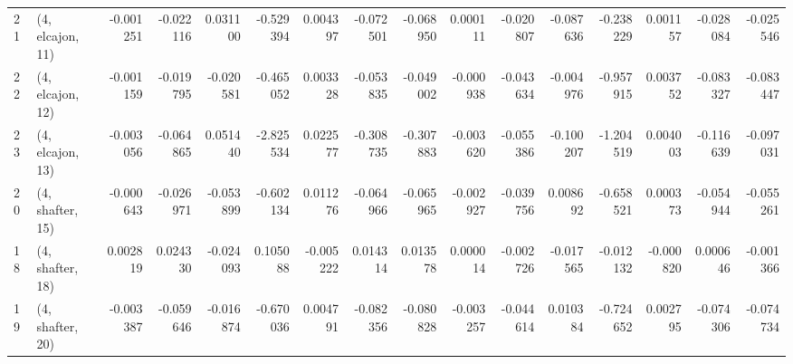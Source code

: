 \begin{tabular}{llrrrrrrrrrrrrrr}
21 &  (4, elcajon, 11) &  -0.001251 & -0.022116 &  0.031100 &  -0.529394 &  0.004397 &  -0.072501 & -0.068950 &  0.000111 & -0.020807 & -0.087636 &  -0.238229 &  0.001157 & -0.028084 & -0.025546 \\
22 &  (4, elcajon, 12) &  -0.001159 & -0.019795 & -0.020581 &  -0.465052 &  0.003328 &  -0.053835 & -0.049002 & -0.000938 & -0.043634 & -0.004976 &  -0.957915 &  0.003752 & -0.083327 & -0.083447 \\
23 &  (4, elcajon, 13) &  -0.003056 & -0.064865 &  0.051440 &  -2.825534 &  0.022577 &  -0.308735 & -0.307883 & -0.003620 & -0.055386 & -0.100207 &  -1.204519 &  0.004003 & -0.116639 & -0.097031 \\
20 &  (4, shafter, 15) &  -0.000643 & -0.026971 & -0.053899 &  -0.602134 &  0.011276 &  -0.064966 & -0.065965 & -0.002927 & -0.039756 &  0.008692 &  -0.658521 &  0.000373 & -0.054944 & -0.055261 \\
18 &  (4, shafter, 18) &   0.002819 &  0.024330 & -0.024093 &   0.105088 & -0.005222 &   0.014314 &  0.013578 &  0.000014 & -0.002726 & -0.017565 &  -0.012132 & -0.000820 &  0.000646 & -0.001366 \\
19 &  (4, shafter, 20) &  -0.003387 & -0.059646 & -0.016874 &  -0.670036 &  0.004791 &  -0.082356 & -0.080828 & -0.003257 & -0.044614 &  0.010384 &  -0.724652 &  0.002795 & -0.074306 & -0.074734 \\
\bottomrule
\end{tabular}
